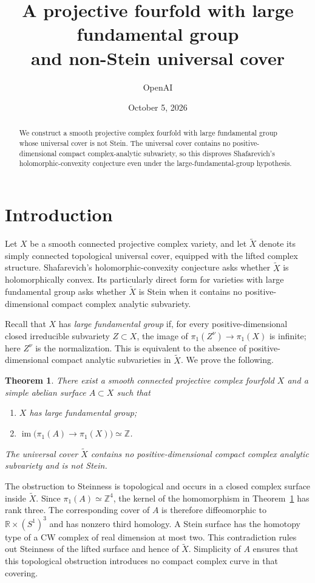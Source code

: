\documentclass[11pt,reqno]{amsart}
\title[Large fundamental group and non-Stein universal cover]{A projective fourfold with large fundamental group\protect\\
and non-Stein universal cover}
\author{OpenAI}
\date{October 5, 2026}
\numberwithin{equation}{section}
\newtheorem{theorem}{Theorem}[section]
\theoremstyle{definition}
\theoremstyle{remark}
\begin{document}
\begin{abstract}
We construct a smooth projective complex fourfold with large fundamental group
whose universal cover is not Stein. The universal cover contains no
positive-dimensional compact complex-analytic subvariety, so this disproves
Shafarevich's holomorphic-convexity conjecture even under the
large-fundamental-group hypothesis.
\end{abstract}

\tableofcontents
\section{Introduction}\label{sec:introduction}

Let $X$ be a smooth connected projective complex variety, and let
$\widetilde X$ denote its simply connected topological universal cover,
equipped with the lifted complex structure.  Shafarevich's
holomorphic-convexity conjecture asks whether $\widetilde X$ is
holomorphically convex.  Its particularly direct form for varieties with
large fundamental group asks whether $\widetilde X$ is Stein when it
contains no positive-dimensional compact complex analytic subvariety.

Recall that $X$ has \emph{large fundamental group} if, for every
positive-dimensional closed irreducible subvariety $Z\subset X$, the image
of $\pi_1(Z^\nu)\to\pi_1(X)$ is infinite; here $Z^\nu$ is the
normalization.  This is equivalent to the absence of positive-dimensional
compact analytic subvarieties in $\widetilde X$.  We prove the following.

\begin{theorem}\label{thm:main}
There exist a smooth connected projective complex fourfold $X$ and a
simple abelian surface $A\subset X$ such that
\begin{enumerate}
\item $X$ has large fundamental group;
\item $\operatorname{im}\bigl(\pi_1(A)\to\pi_1(X)\bigr)\simeq\mathbb Z$.
\end{enumerate}
The universal cover $\widetilde X$ contains no positive-dimensional
compact complex analytic subvariety and is not Stein.
\end{theorem}

The obstruction to Steinness is topological and occurs in a closed
complex surface inside $\widetilde X$.  Since $\pi_1(A)\simeq\mathbb Z^4$,
the kernel of the homomorphism in Theorem~\ref{thm:main} has rank three.
The corresponding cover of $A$ is therefore diffeomorphic to
$\mathbb R\times(S^1)^3$ and has nonzero third homology.  A Stein surface has
the homotopy type of a CW complex of real dimension at most two.
This contradiction rules out Steinness of the lifted surface and hence
of $\widetilde X$.  Simplicity of $A$ ensures that this topological
obstruction introduces no compact complex curve in that covering.
\end{document}
